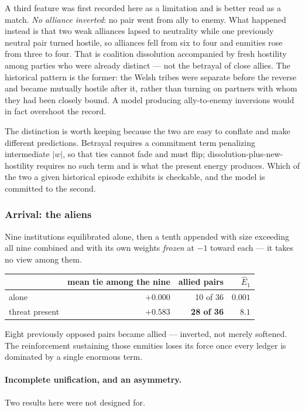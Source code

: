 \documentclass[11pt]{article}
\numberwithin{equation}{section}
\theoremstyle{plain}
\theoremstyle{definition}
\theoremstyle{remark}
\begin{document}
A third feature was first recorded here as a limitation and is better
read as a match. \emph{No alliance inverted}: no pair went from ally to
enemy. What happened instead is that two weak alliances lapsed to
neutrality while one previously neutral pair turned hostile, so
alliances fell from six to four and enmities rose from three to four.
That is coalition dissolution accompanied by fresh hostility among
parties who were already distinct --- not the betrayal of close allies.
The historical pattern is the former: the Welsh tribes were separate
before the reverse and became mutually hostile after it, rather than
turning on partners with whom they had been closely bound. A model
producing ally-to-enemy inversions would in fact overshoot the record.

The distinction is worth keeping because the two are easy to conflate
and make different predictions. Betrayal requires a commitment term
penalizing intermediate $|w|$, so that ties cannot fade and must flip;
dissolution-plus-new-hostility requires no such term and is what the
present energy produces. Which of the two a given historical episode
exhibits is checkable, and the model is committed to the second.

\subsubsection{Arrival: the aliens}\label{ad:subsub:aliens}

Nine institutions equilibrated alone, then a tenth appended with size
exceeding all nine combined and with its own weights \emph{frozen} at
$-1$ toward each --- it takes no view among them.

\begin{center}\small
\begin{tabular}{@{}lrrr@{}}
\toprule
& mean tie among the nine & allied pairs & $\hat E_1$\\
\midrule
alone & $+0.000$ & 10 of 36 & $0.001$\\
threat present & $+0.583$ & \textbf{28 of 36} & $8.1$\\
\bottomrule
\end{tabular}
\end{center}

Eight previously opposed pairs became allied --- inverted, not merely
softened. The reinforcement sustaining those enmities loses its force
once every ledger is dominated by a single enormous term.

\paragraph{Incomplete unification, and an asymmetry.}\label{ad:rem:aliensreading}
Two results here were not designed for.
\end{document}
